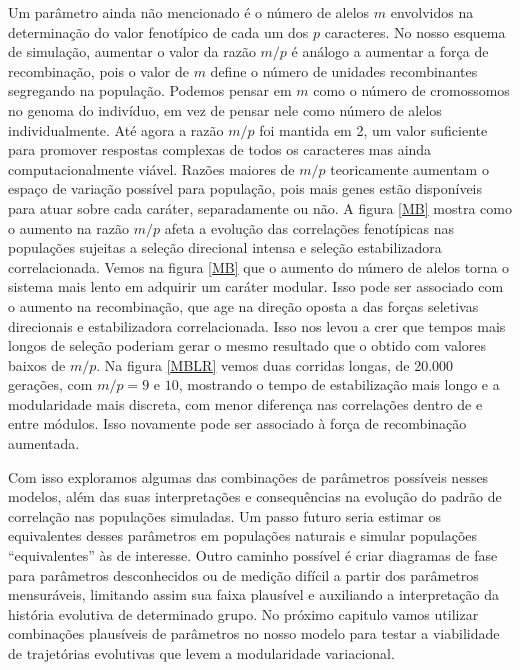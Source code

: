 Um parâmetro ainda não mencionado é o número de alelos $m$ envolvidos na
determinação do valor fenotípico de cada um dos $p$ caracteres. 
No nosso esquema de simulação, aumentar o valor da razão $m/p$ é análogo
a aumentar a força de recombinação, pois o valor de $m$ define o número
de unidades recombinantes segregando na população. 
Podemos pensar em $m$ como o número de cromossomos no genoma do
indivíduo, em vez de pensar nele como número de alelos individualmente. 
Até agora a razão $m/p$ foi mantida em 2, um valor suficiente para
promover respostas complexas de todos os caracteres mas ainda
computacionalmente viável. 
Razões maiores de $m/p$ teoricamente aumentam o espaço de variação
possível para população, pois mais genes estão disponíveis para atuar
sobre cada caráter, separadamente ou não. 
A figura \ref{MB} mostra como o aumento na razão $m/p$ afeta a evolução
das correlações fenotípicas nas populações sujeitas a seleção direcional
intensa e seleção estabilizadora correlacionada. 
Vemos na figura \ref{MB} que o aumento do número de alelos torna o
sistema mais lento em adquirir um caráter modular. 
Isso pode ser associado com o aumento na recombinação, que age na
direção oposta a das forças seletivas direcionais e estabilizadora
correlacionada. 
Isso nos levou a crer que tempos mais longos de seleção poderiam gerar o
mesmo resultado que o obtido com valores baixos de $m/p$. 
Na figura \ref{MBLR} vemos duas corridas longas, de 20.000 gerações, com
$m/p = 9$ e $10$, mostrando o tempo de estabilização mais longo e a
modularidade mais discreta, com menor diferença nas correlações dentro
de e entre módulos. 
Isso novamente pode ser associado à força de recombinação aumentada. 

Com isso exploramos algumas das combinações de parâmetros possíveis
nesses modelos, além das suas interpretações e consequências na evolução
do padrão de correlação nas populações simuladas. 
Um passo futuro seria estimar os equivalentes desses parâmetros em
populações naturais e simular populações ``equivalentes'' às de
interesse. 
Outro caminho possível é criar diagramas de fase para parâmetros
desconhecidos ou de medição difícil a partir dos parâmetros mensuráveis, 
limitando assim sua faixa plausível e auxiliando a interpretação da
história evolutiva de determinado grupo. 
No próximo capitulo vamos utilizar combinações plausíveis de parâmetros
no nosso modelo para testar a viabilidade de trajetórias evolutivas que
levem a modularidade variacional. 

